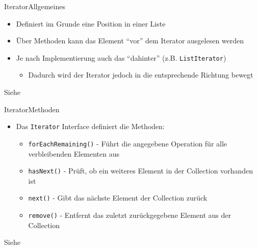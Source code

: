 \begin{frame}{Iterator}{Allgemeines}
    \begin{itemize}[<+->]
        \item Definiert im Grunde eine Position in einer Liste
        \item Über Methoden kann das Element "`vor"' dem Iterator ausgelesen werden
        \item Je nach Implementierung auch das "`dahinter"' (z.B. \texttt{ListIterator})
        \begin{itemize}
            \item Dadurch wird der Iterator jedoch in die entsprechende Richtung bewegt
        \end{itemize}
    \end{itemize}
    Siehe \cite{orac:iterator}
\end{frame}

\begin{frame}{Iterator}{Methoden}
    \begin{itemize}[<+->]
        \item Das \texttt{Iterator} Interface definiert die Methoden:
        \begin{itemize}
            \item \texttt{forEachRemaining()} - Führt die angegebene Operation für alle verbleibenden Elementen aus
            \item \texttt{hasNext()} - Prüft, ob ein weiteres Element in der Collection vorhanden ist
            \item \texttt{next()} - Gibt das nächste Element der Collection zurück
            \item \texttt{remove()} - Entfernt das zuletzt zurückgegebene Element aus der Collection
        \end{itemize}
    \end{itemize}
    Siehe \cite{orac:iterator}
\end{frame}

